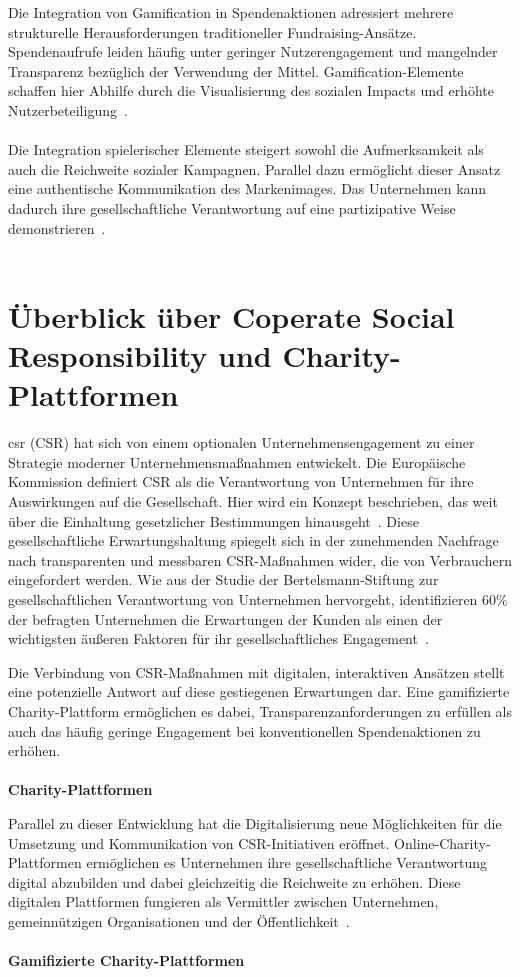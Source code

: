 Die Integration von Gamification in Spendenaktionen adressiert mehrere strukturelle Herausforderungen traditioneller Fundraising-Ansätze.
Spendenaufrufe leiden häufig unter geringer Nutzerengagement und mangelnder Transparenz bezüglich der Verwendung der Mittel.
Gamification-Elemente schaffen hier Abhilfe durch die Visualisierung des sozialen Impacts und erhöhte Nutzerbeteiligung~\cite{golrang2021applying}.
\\\\
Die Integration spielerischer Elemente steigert sowohl die Aufmerksamkeit als auch die Reichweite sozialer Kampagnen.
Parallel dazu ermöglicht dieser Ansatz eine authentische Kommunikation des Markenimages.
Das Unternehmen kann dadurch ihre gesellschaftliche Verantwortung auf eine partizipative Weise demonstrieren~\cite{golrang2021applying}.
\\\\
\section{Überblick über Coperate Social Responsibility und Charity-Plattformen}
\gls{csr} (CSR) hat sich von einem optionalen Unternehmensengagement zu einer Strategie moderner Unternehmensmaßnahmen entwickelt.
Die Europäische Kommission definiert CSR als die Verantwortung von Unternehmen für ihre Auswirkungen auf die Gesellschaft.
Hier wird ein Konzept beschrieben, das weit über die Einhaltung gesetzlicher Bestimmungen hinausgeht~\cite{european_commission2011csr}.
Diese gesellschaftliche Erwartungshaltung spiegelt sich in der zunehmenden Nachfrage nach transparenten und messbaren CSR-Maßnahmen wider, die von Verbrauchern eingefordert werden.
Wie aus der Studie der Bertelsmann-Stiftung zur gesellschaftlichen Verantwortung von Unternehmen hervorgeht, identifizieren 60\% der befragten Unternehmen die Erwartungen der Kunden als einen der wichtigsten äußeren Faktoren für ihr gesellschaftliches Engagement~\cite{bertelsmann2006gesellschaftliche}.

Die Verbindung von CSR-Maßnahmen mit digitalen, interaktiven Ansätzen stellt eine potenzielle Antwort auf diese gestiegenen Erwartungen dar.
Eine gamifizierte Charity-Plattform ermöglichen es dabei, Transparenzanforderungen zu erfüllen als auch das häufig geringe Engagement bei konventionellen Spendenaktionen zu erhöhen.
\\\\
\textbf{Charity-Plattformen}

Parallel zu dieser Entwicklung hat die Digitalisierung neue Möglichkeiten für die Umsetzung und Kommunikation von CSR-Initiativen eröffnet.
Online-Charity-Plattformen ermöglichen es Unternehmen ihre gesellschaftliche Verantwortung digital abzubilden und dabei gleichzeitig die Reichweite zu erhöhen.
Diese digitalen Plattformen fungieren als Vermittler zwischen Unternehmen, gemeinnützigen Organisationen und der Öffentlichkeit~\cite{csr40_2020}.
\\\\
\textbf{Gamifizierte Charity-Plattformen}

